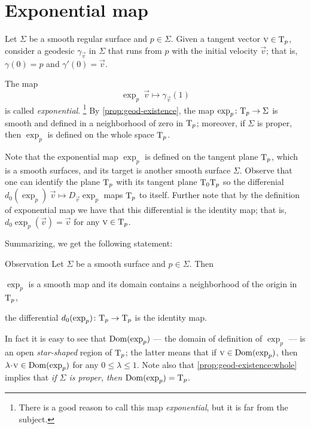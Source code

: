 \section{Exponential map}\label{sec:exp}

Let $\Sigma$ be a smooth regular surface and $p\in \Sigma$.
Given a tangent vector ${\text{\sc{v}}}\in \mathrm{T}_p$, consider a geodesic $\gamma_{\vec v}$ in $\Sigma$ that runs from $p$ with the initial velocity ${\vec v}$;  
that is, $\gamma(0)=p$ and $\gamma'(0)={\vec v}$.

The map 
\[\exp_p\:\vec v\mapsto \gamma_{\vec v}(1)\]
is called \emph{exponential}.%
\footnote{There is a good reason to call this map {}\emph{exponential}, but it is far from the subject.}
By \ref{prop:geod-existence}, the map $\exp_p\colon\mathrm{T}_p\to \Sigma$ is smooth and defined in a neighborhood of zero in $\mathrm{T}_p$;
moreover, if $\Sigma$ is proper, then $\exp_p$ is defined on the whole space $\mathrm{T}_p$.

Note that the exponential map $\exp_p$ 
is defined on the tangent plane $\mathrm{T}_p$, which is a smooth surfaces,
and its target is another smooth surface $\Sigma$.
Observe that one can identify the plane $\mathrm{T}_p$
with its tangent plane $\mathrm{T}_0\mathrm{T}_p$ so the differenial $d_0(\exp_p)\:\vec v\mapsto D_{\vec v}\exp_p$ maps $\mathrm{T}_p$ to itself.
Further note that by the definition of exponential map we have that this differential is the identity map; that is, $d_0\exp_p(\vec v)=
\vec v$ for any $\text{\sc{v}}\in \mathrm{T}_p$.

Summarizing, we get the following statement:

\begin{thm}{Observation}\label{obs:d(exp)=1}
Let $\Sigma$ be a smooth surface and $p\in \Sigma$.
Then 
\begin{subthm}{}
$\exp_p$ is a smooth map and its domain contains a neighborhood of the origin in $\mathrm{T}_p$, 
\end{subthm}

\begin{subthm}{}
the differential $d_0(\exp_p)\colon\mathrm{T}_p\to \mathrm{T}_p$ is the identity map.
\end{subthm}

\end{thm}

In fact it is easy to see that $\mathop{\rm Dom}\nolimits(\exp_p)$ --- the domain of definition of $\exp_p$ --- is an open \emph{star-shaped} region of $\mathrm{T}_p$;
the latter means that if $\text{\sc{v}}\in \mathop{\rm Dom}\nolimits(\exp_p)$, then $\lambda\cdot\vec v\in \Dom(\exp_p)$ for any $0\le \lambda\le 1$.
Note also that \ref{prop:geod-existence:whole} implies that \emph{if $\Sigma$ is proper, then $\mathop{\rm Dom}\nolimits(\exp_p)=\mathrm{T}_p$}.


